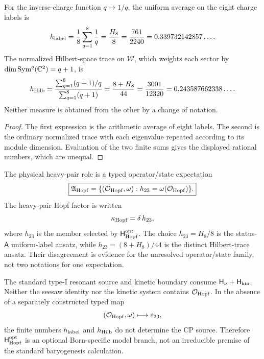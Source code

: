 \documentclass[11pt,a4paper]{article}
\newcommand{\Hkin}{\mathsf{H}_{\rm kin}}
\newcommand{\Hnu}{\mathsf{H}_{\nu}}
\newcommand{\Hhopfopt}{\mathsf H_{\rm Hopf}^{\rm opt}}
\begin{document}
\begin{proposition}
\label{p7v2:prop:hopf-trace-distinction}
For the inverse-charge function \(q\mapsto1/q\), the uniform average on the
eight charge labels is
\begin{equation}
\label{p7v2:eq:hopf-label-average}
 h_{\rm label}
 =
 \frac18\sum_{q=1}^{8}\frac1q
 =
 \frac{H_8}{8}
 =
 \frac{761}{2240}
 =
 0.339732142857\ldots.
\end{equation}
The normalized Hilbert-space trace on
\(\mathcal W\), which weights each sector by \(\dim\operatorname{Sym}^q(\mathbb{C}^2)=q+1\), is
\begin{equation}
\label{p7v2:eq:hopf-hilbert-average}
 h_{\rm Hilb}
 =
 \frac{\sum_{q=1}^{8}(q+1)/q}
      {\sum_{q=1}^{8}(q+1)}
 =
 \frac{8+H_8}{44}
 =
 \frac{3001}{12320}
 =
 0.243587662338\ldots.
\end{equation}
Neither measure is obtained from the other by a change of notation.
\end{proposition}

\begin{proof}
The first expression is the arithmetic average of eight labels.  The second is
the ordinary normalized trace with each eigenvalue repeated according to its
module dimension.  Evaluation of the two finite sums gives the displayed
rational numbers, which are unequal.
\end{proof}

\begin{definition}
\label{p7v2:def:open-hopf-element}
The physical heavy-pair role is a typed operator/state expectation
\[
 \boxed{
 \mathfrak A_{\rm Hopf}
 =\{(\mathcal O_{\rm Hopf},\omega):
      h_{23}=\omega(\mathcal O_{\rm Hopf})\}.
 }
\]
The heavy-pair Hopf factor is written
\begin{equation}
\label{p7v2:eq:open-hopf-factor}
 \kappa_{\rm Hopf}=\delta\,h_{23},
\end{equation}
where \(h_{23}\) is the member selected by \(\Hhopfopt\).  The choice
\(h_{23}=H_8/8\) is the status-\(\mathsf A\) uniform-label ansatz, while
\(h_{23}=(8+H_8)/44\) is the distinct Hilbert-trace ansatz.  Their disagreement
is evidence for the unresolved operator/state family, not two notations for one
expectation.
\end{definition}

\begin{proposition}
\label{p7v2:prop:hopf-optional}
The standard type-I resonant source and kinetic boundary consume
\(\Hnu+\Hkin\).  Neither the seesaw identity nor the kinetic system contains
\(\mathcal O_{\rm Hopf}\).  In the absence of a separately constructed typed
map
\[
 (\mathcal O_{\rm Hopf},\omega)
 \longmapsto \varepsilon_{23},
\]
the finite numbers \(h_{\rm label}\) and \(h_{\rm Hilb}\) do not determine the
CP source.  Therefore \(\Hhopfopt\) is an optional Born-specific model branch,
not an irreducible premise of the standard baryogenesis calculation.
\end{proposition}
\end{document}
